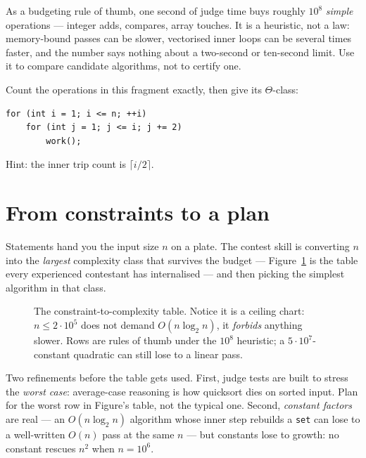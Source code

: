 \begin{definition}
As a budgeting rule of thumb, one second of judge time buys roughly $10^8$
\emph{simple} operations --- integer adds, compares, array touches. It is a
heuristic, not a law: memory-bound passes can be slower, vectorised inner
loops can be several times faster, and the number says nothing about a
two-second or ten-second limit. Use it to compare candidate algorithms, not
to certify one.
\end{definition}

\begin{exercise}[medium]\label{exr:countops}
Count the operations in this fragment exactly, then give its $\Theta$-class:
\begin{lstlisting}
for (int i = 1; i <= n; ++i)
    for (int j = 1; j <= i; j += 2)
        work();
\end{lstlisting}
Hint: the inner trip count is $\lceil i/2 \rceil$.
\end{exercise}

\section{From constraints to a plan}\label{sec:constraints}

Statements hand you the input size $n$ on a plate. The contest skill is
converting $n$ into the \emph{largest} complexity class that survives the
budget --- Figure~\ref{fig:constraints} is the table every experienced
contestant has internalised --- and then picking the simplest algorithm in
that class.

\begin{figure}[ht]\centering

\caption{The constraint-to-complexity table. Notice it is a ceiling chart:
$n\le 2\cdot10^5$ does not demand $O(n\log_2 n)$, it \emph{forbids} anything
slower. Rows are rules of thumb under the $10^8$ heuristic; a
$5\cdot10^7$-constant quadratic can still lose to a linear pass.}
\label{fig:constraints}
\end{figure}

Two refinements before the table gets used. First, judge tests are built to
stress the \emph{worst case}: average-case reasoning is how
quicksort dies on sorted input. Plan for the worst row in Figure's table,
not the typical one. Second, \emph{constant factors}
are real --- an $O(n\log_2 n)$ algorithm whose inner step rebuilds a
\texttt{set} can lose to a well-written $O(n)$ pass at the same $n$ --- but
constants lose to growth: no constant rescues $n^2$ when $n=10^6$.

